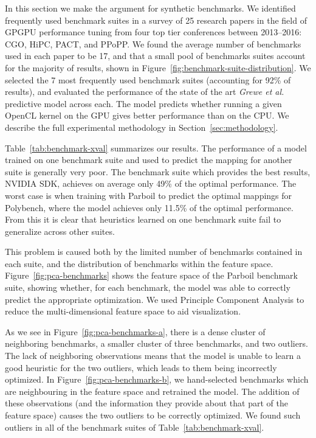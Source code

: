 In this section we make the argument for synthetic benchmarks. We identified frequently used benchmark suites in a survey of 25 research papers in the field of GPGPU performance tuning from four top tier conferences between 2013--2016: CGO, HiPC, PACT, and PPoPP. We found the average number of benchmarks used in each paper to be 17, and that a small pool of benchmarks suites account for the majority of results, shown in Figure~\ref{fig:benchmark-suite-distribution}. We selected the 7 most frequently used benchmark suites (accounting for 92\% of results), and evaluated the performance of the state of the art \emph{Grewe et   al.}~\cite{Grewe2013} predictive model across each. The model predicts whether running a given OpenCL kernel on the GPU gives better performance than on the CPU. We describe the full experimental methodology in Section~\ref{sec:methodology}.

Table~\ref{tab:benchmark-xval} summarizes our results. The performance of a model trained on one benchmark suite and used to predict the mapping for another suite is generally very poor. The benchmark suite which provides the best results, NVIDIA SDK, achieves on average only 49\% of the optimal performance. The worst case is when training with Parboil to predict the optimal mappings for Polybench, where the model achieves only 11.5\% of the optimal performance. From this it is clear that heuristics learned on one benchmark suite fail to generalize across other suites.

This problem is caused both by the limited number of benchmarks contained in each suite, and the distribution of benchmarks within the feature space. Figure~\ref{fig:pca-benchmarks} shows the feature space of the Parboil benchmark suite, showing whether, for each benchmark, the model was able to correctly predict the appropriate optimization.  We used Principle Component Analysis to reduce the multi-dimensional feature space to aid visualization.

As we see in Figure~\ref{fig:pca-benchmarks-a}, there is a dense cluster of neighboring benchmarks, a smaller cluster of three benchmarks, and two outliers. The lack of neighboring observations means that the model is unable to learn a good heuristic for the two outliers, which leads to them being incorrectly optimized. In Figure~\ref{fig:pca-benchmarks-b}, we hand-selected benchmarks which are neighbouring in the feature space and retrained the model. The addition of these observations (and the information they provide about that part of the feature space) causes the two outliers to be correctly optimized. We found such outliers in all of the benchmark suites of Table~\ref{tab:benchmark-xval}.

